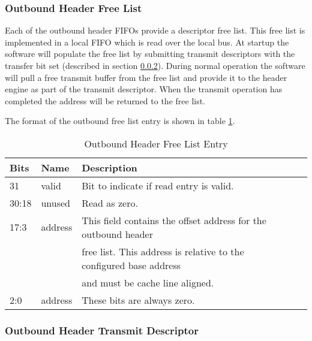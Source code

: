 \documentclass[11pt]{article}
\begin{document}
\subsubsection{Outbound Header Free List}

Each of the outbound header FIFOs provide a descriptor free list.  This free list is implemented in a local FIFO which is read over the local bus. 
At startup the software will populate the free list by submitting transmit descriptors with the transfer bit set (described in section \ref{subsec:ob_tx_desc}). 
During normal operation the software will pull a free transmit buffer from the free list and provide it to the header engine as part of the transmit descriptor. 
When the transmit operation has completed the address will be returned to the free list. 

The format of the outbound free list entry is shown in table \ref{tab:ob_tx_flist}.

\begin{table}[H]
\small
\centering
   \begin{tabular}{| l | l | l | l | l | } 
      \hline \textbf{Bits} & \textbf{Name} & \textbf{Description} \\
      \hline 31            & valid         & Bit to indicate if read entry is valid. \\
      \hline 30:18         & unused        & Read as zero.                                                        \\
      \hline 17:3          & address       & This field contains the offset address for the outbound header    \\
                           &               & free list. This address is relative to the configured base address \\
                           &               & and must be cache line aligned.                                    \\
      \hline 2:0           & address       & These bits are always zero.                                                \\
      \hline
   \end{tabular}
   \caption{Outbound Header Free List Entry}
   \label{tab:ob_tx_flist}
\end{table}

\subsubsection{Outbound Header Transmit Descriptor}
\label{subsec:ob_tx_desc}
\end{document}
